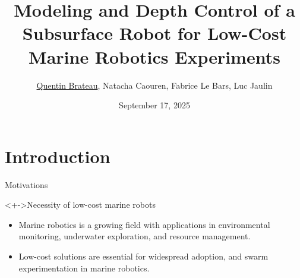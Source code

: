 \documentclass[9pt, xcolor={usenames, dvipsnames}]{beamer}
\title{Modeling and Depth Control of a Subsurface Robot for Low-Cost Marine Robotics Experiments}
\date{September 17, 2025}
\author{\underline{Quentin Brateau}, Natacha Caouren, Fabrice Le Bars, Luc Jaulin}
\institute{ENSTA, 2 rue François Verny, 29200 Brest, France}
\begin{document}
    \maketitle

    \section{Introduction}

        \begin{frame}{Motivations}
            \begin{block}<+->{Necessity of low-cost marine robots}
                \begin{itemize}
                    \item Marine robotics is a growing field with applications in environmental monitoring, underwater exploration, and resource management.
                    \item Low-cost solutions are essential for widespread adoption, and swarm experimentation in marine robotics.
                \end{itemize}
            \end{block}
        \end{frame}
\end{document}
